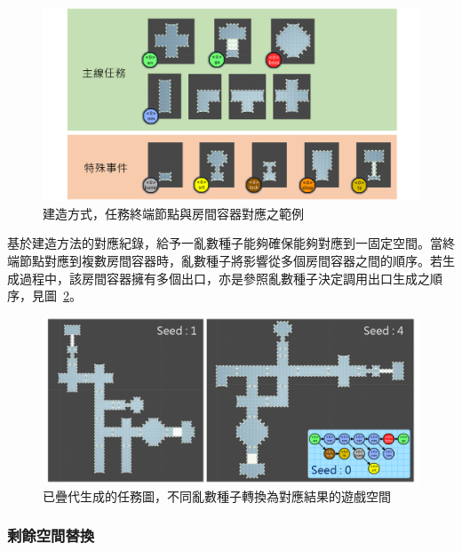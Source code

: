 \begin{figure}[ht]
  \begin{center}
    \includegraphics[width=1.0\textwidth]{figures/mission-to-space-instruction.png}
    \caption{建造方式，任務終端節點與房間容器對應之範例} 
    \label{fig:mission-to-space-instruction}
  \end{center}
\end{figure}

基於建造方法的對應紀錄，給予一亂數種子能夠確保能夠對應到一固定空間。當終端節點對應到複數房間容器時，亂數種子將影響從多個房間容器之間的順序。若生成過程中，該房間容器擁有多個出口，亦是參照亂數種子決定調用出口生成之順序，見圖~\ref{fig:mission-to-space-instruction-result}。

\begin{figure}[ht]
  \begin{center}
    \includegraphics[width=1.0\textwidth]{figures/mission-to-space-instruction-result.png}
    \caption{已疊代生成的任務圖，不同亂數種子轉換為對應結果的遊戲空間} 
    \label{fig:mission-to-space-instruction-result}
  \end{center}
\end{figure}

\subsubsection{剩餘空間替換}
\label{sssec:method-spacepieces-frommissiontospace-replacement}

